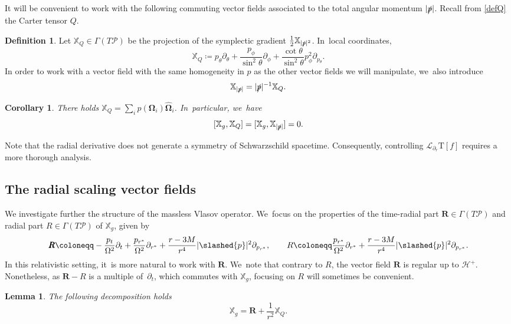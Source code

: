 \documentclass[JEP,XML,SOM,Unicode,published]{cedram}
\theoremstyle{plain}
\newtheorem{lemma}[proposition]{Lemma}
\newtheorem{corollary}[proposition]{Corollary}
\theoremstyle{definition}
\newtheorem{definition}[proposition]{Definition}
\newcommand\T{{\mathbb{X}}}
\renewcommand\H{{\mathcal{H}^+}}
\begin{document}
It will be convenient to work with the following commuting vector fields associated to the total angular momentum $|\slashed{p}|$. Recall from \eqref{defQ} the Carter tensor $Q$.

\begin{definition}
Let $\T_Q \in \Gamma(T\mathcal{P})$ be the projection of the symplectic gradient $\frac{1}{2}\T_{|\slashed{p}|^2}$. In~local coordinates,
\[
\T_Q \coloneqq p_{\theta} \partial_{\theta} + \frac{p_{\phi}}{ \sin^2\theta } \partial_{\phi} + \frac{\cot \theta }{ \sin^2 \theta} p_{\phi}^2 \partial_{p_{\theta} }.
\]
In order to work with a vector field with the same homogeneity in $p$ as the other vector fields we will manipulate, we~also introduce
\[
\T_{|\slashed{p}|} = |\slashed{p}|^{-1} \T_Q.
\]
\end{definition}

\begin{corollary}\label{CorTQ}
There holds $\T_Q=\sum_i p(\mathbf{\Omega}_i) \widehat{\mathbf{\Omega}}_i$. In~particular, we~have
\[
[\T_g,\T_Q]=[\T_g,\T_{|\slashed{p}|}]=0.
\]
\end{corollary}

Note that the radial derivative does not generate a symmetry of Schwarzschild spacetime. Consequently, controlling $\mathcal{L}_{\partial_r} \mathrm{T}[f]$ requires a more thorough analysis.

\subsection{The radial scaling vector fields}

We investigate further the structure of the massless Vlasov operator. We~focus on the properties of the time-radial part $\pmb{R} \in \Gamma(T\mathcal{P})$ and radial part $R\in \Gamma(T\mathcal{P})$ of $\T_g$, given by
\begin{equation}\label{eq:defR}
\pmb{R} \coloneqq -\frac{p_t}{\Omega^2} \partial_t+ \frac{p_{r^*}}{\Omega^2}\partial_{r^*}+\frac{r-3M}{r^4} |\slashed{p}|^2 \partial_{p_{r^*}}, \qquad R \coloneqq \frac{p_{r^*}}{\Omega^2}\partial_{r^*}+\frac{r-3M}{r^4} |\slashed{p}|^2 \partial_{p_{r^*}}.
\end{equation}
In this relativistic setting, it~is more natural to work with $\pmb{R}$. We~note that contrary to $R$, the vector field $\pmb{R}$ is regular up to $\H$. Nonetheless, as $\pmb{R}-R$ is a multiple of~$\partial_t$, which commutes with $\T_g$, focusing on $R$ will sometimes be convenient.

\begin{lemma}\label{LemDecompT}
The following decomposition holds
\[
\T_g= \pmb{R}+\frac{1}{r^2} \T_Q.
\]
\end{lemma}
\end{document}
